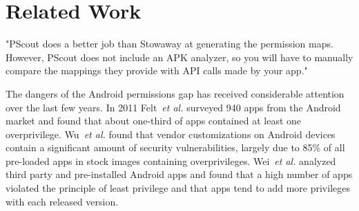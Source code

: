 \documentclass{sig-alternate-05-2015}
\begin{document}
\section{Related Work}
\label{sec: relatedwork}





"PScout does a better job than Stowaway at generating the permission maps. However, PScout does not include an APK analyzer, so you will have to manually compare the mappings they provide with API calls made by your app."



%   





The dangers of the Android permissions gap has received considerable attention over the last few years. In 2011 Felt~\emph{et al.}\cite{Felt:2011:APD:2046707.2046779} surveyed 940 apps from the Android market and found that about one-third of apps contained at least one overprivilege. Wu~\emph{et al.}\cite{Wu:2013:IVC:2508859.2516728} found that vendor customizations on Android devices contain a significant amount of security vulnerabilities, largely due to 85\% of all pre-loaded apps in stock images containing overprivileges. Wei~\emph{et al.}\cite{Wei:2012:PEA:2420950.2420956} analyzed third party and pre-installed Android apps and found that a high number of apps violated the principle of least privilege and that apps tend to add more privileges with each released version. %
\end{document}
